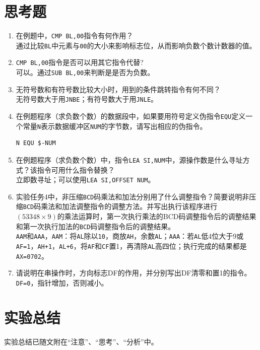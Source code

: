 \documentclass[11pt]{SEU-Digital-Report}
\begin{document}
\section{思考题}
\begin{enumerate}
    \item 在例题中，\texttt{CMP BL,00}指令有何作用？\\
    通过比较\texttt{BL}中元素与\texttt{00}的大小来影响标志位，从而影响负数个数计数器的值。
    \item \texttt{CMP BL,00}指令是否可以用其它指令代替?\\
    可以。通过\texttt{SUB BL,00}来判断是是否为负数。
    \item 无符号数和有符号数比较大小时，用到的条件跳转指令有何不同？\\
    无符号数大于用\texttt{JNBE}；有符号数大于用\texttt{JNLE}。
    \item 在例题程序（求负数个数）的数据段中，如果要用符号定义伪指令\texttt{EQU}定义一个常量\texttt{N}表示数据缓冲区\texttt{NUM}的字节数，请写出相应的伪指令。\\
    \begin{lstlisting}[language={[x86masm]Assembler},title=code]
    N EQU $-NUM
    \end{lstlisting}
    \item 在例题程序（求负数个数）中，指令\texttt{LEA SI,NUM}中，源操作数是什么寻址方式？该指令可用什么指令替换？\\
    立即数寻址；可以使用\texttt{LEA SI,OFFSET NUM}。
    \item 实验任务4中，非压缩\texttt{BCD}码乘法和加法分别用了什么调整指令？简要说明非压缩\texttt{BCD}码乘法和加法调整指令的调整方法。并写出执行该程序进行$(53348\times 9)$的乘法运算时，第一次执行乘法的BCD码调整指令后的调整结果和第一次执行加法的\texttt{BCD}码调整指令后的调整结果。\\
    \texttt{AAM}和\texttt{AAA}，\texttt{AAM}：将\texttt{AL}除以\texttt{10}，商放\texttt{AH}，余数\texttt{AL}；\texttt{AAA}：若\texttt{AL}低4位大于9或\texttt{AF=1}，\texttt{AH+1}，\texttt{AL+6}，将\texttt{AF}和\texttt{CF}置1，再清除\texttt{AL}高四位；执行完成的结果都是\texttt{AX=0702}。
    \item 请说明在串操作时，方向标志DF的作用，并分别写出DF清零和置1的指令。\\
    \texttt{DF=0}，指针增加，否则减小。

\end{enumerate}

\section{实验总结}
实验总结已随文附在“注意”、“思考”、“分析”中。

\printbibliography
\end{document}
